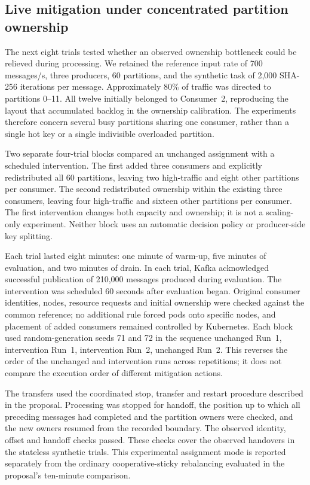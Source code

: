 \documentclass[10pt]{article}
\begin{document}
\subsection{Live mitigation under concentrated partition ownership}
\label{sec:live-mitigation-results}

The next eight trials tested whether an observed ownership bottleneck could be relieved during processing. We retained the reference input rate of 700 messages/s, three producers, 60 partitions, and the synthetic task of 2,000 SHA-256 iterations per message. Approximately 80\% of traffic was directed to partitions 0--11. All twelve initially belonged to Consumer~2, reproducing the layout that accumulated backlog in the ownership calibration. The experiments therefore concern several busy partitions sharing one consumer, rather than a single hot key or a single indivisible overloaded partition.

Two separate four-trial blocks compared an unchanged assignment with a scheduled intervention. The first added three consumers and explicitly redistributed all 60 partitions, leaving two high-traffic and eight other partitions per consumer. The second redistributed ownership within the existing three consumers, leaving four high-traffic and sixteen other partitions per consumer. The first intervention changes both capacity and ownership; it is not a scaling-only experiment. Neither block uses an automatic decision policy or producer-side key splitting.

Each trial lasted eight minutes: one minute of warm-up, five minutes of evaluation, and two minutes of drain. In each trial, Kafka acknowledged successful publication of 210,000 messages produced during evaluation. The intervention was scheduled 60 seconds after evaluation began. Original consumer identities, nodes, resource requests and initial ownership were checked against the common reference; no additional rule forced pods onto specific nodes, and placement of added consumers remained controlled by Kubernetes. Each block used random-generation seeds 71 and 72 in the sequence unchanged Run~1, intervention Run~1, intervention Run~2, unchanged Run~2. This reverses the order of the unchanged and intervention runs across repetitions; it does not compare the execution order of different mitigation actions.

The transfers used the coordinated stop, transfer and restart procedure described in the proposal. Processing was stopped for handoff, the position up to which all preceding messages had completed and the partition owners were checked, and the new owners resumed from the recorded boundary. The observed identity, offset and handoff checks passed. These checks cover the observed handovers in the stateless synthetic trials. This experimental assignment mode is reported separately from the ordinary cooperative-sticky rebalancing evaluated in the proposal's ten-minute comparison.
\end{document}
